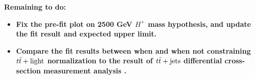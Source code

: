 \textbf{Remaining to do:}\\
\begin{itemize}
    \item \textbf{Fix the pre-fit plot on 2500 GeV $H^{+}$ mass hypothesis, and update the fit result and expected upper limit. }
    \item \textbf{Compare the fit results between when and when not constraining $t\Bar{t}+\text{light}$ normalization to the result of $t\Bar{t}+\text{jets}$ differential cross-section measurement analysis \cite{aad2022measurements}. }
\end{itemize}